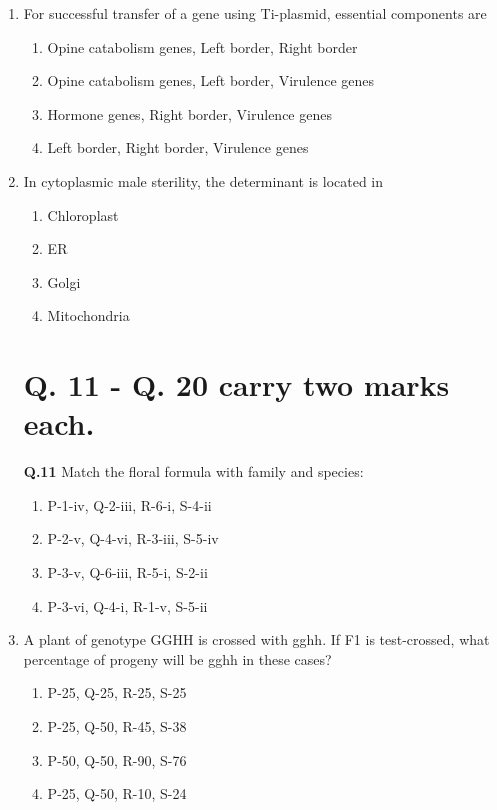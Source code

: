 \documentclass[journal]{IEEEtran}
\begin{document}
\begin{enumerate}
\item For successful transfer of a gene using Ti-plasmid, essential components are\hfill  \textit{}
\begin{enumerate}
    \item Opine catabolism genes, Left border, Right border
    \item Opine catabolism genes, Left border, Virulence genes
    \item Hormone genes, Right border, Virulence genes
    \item Left border, Right border, Virulence genes
\end{enumerate}

\item In cytoplasmic male sterility, the determinant is located in\hfill  \textit{}
\begin{enumerate}
    \item Chloroplast
    \item ER
    \item Golgi
    \item Mitochondria
\end{enumerate}

\section*{Q. 11 - Q. 20 carry two marks each.}

\textbf{Q.11} Match the floral formula with family and species:\hfill  \textit{}
\begin{enumerate}
    \item P-1-iv, Q-2-iii, R-6-i, S-4-ii
    \item P-2-v, Q-4-vi, R-3-iii, S-5-iv
    \item P-3-v, Q-6-iii, R-5-i, S-2-ii
    \item P-3-vi, Q-4-i, R-1-v, S-5-ii
\end{enumerate}

\item A plant of genotype GGHH is crossed with gghh. If F1 is test-crossed, what percentage of progeny will be gghh in these cases?\hfill  \textit{}
\begin{enumerate}
    \item P-25, Q-25, R-25, S-25
    \item P-25, Q-50, R-45, S-38
    \item P-50, Q-50, R-90, S-76
    \item P-25, Q-50, R-10, S-24
\end{enumerate}


\end{enumerate}
\end{document}
